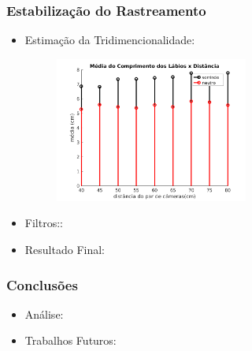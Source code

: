 \documentclass[brazil]{beamer}
\begin{document}
\begin{frame}
\frametitle{Estabilização do Rastreamento}
  \begin{itemize}
      \item Estimação da Tridimencionalidade:
      \begin{figure}
        \centering
        \includegraphics[width = 0.6\textwidth, keepaspectratio]{./img/media_3d.png}
      \end{figure}
               
  \end{itemize} 
\end{frame}

\begin{frame}
  \begin{itemize}
      \item Filtros::
              
  \end{itemize} 
\end{frame}

\begin{frame}
  \begin{itemize}
      \item Resultado Final:
              
  \end{itemize} 
\end{frame}


\begin{frame}
\frametitle{Conclusões}
  \begin{itemize}
      \item Análise:
      
      \item Trabalhos Futuros:
              
  \end{itemize} 
\end{frame}
\end{document}
